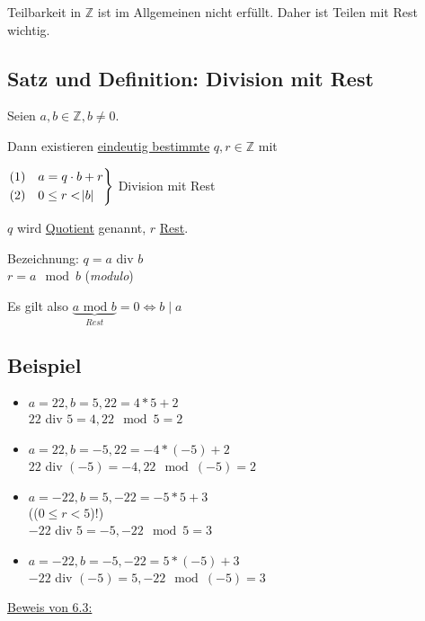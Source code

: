 \documentclass[a4paper, 12pt, twoside] {article}
\newcommand{\attention}{{\fontencoding{U}\fontfamily{futs}\selectfont\char 66\relax}\space}
\begin{document}
Teilbarkeit in $\mathbb{Z}$ ist im Allgemeinen nicht erfüllt. Daher ist Teilen mit Rest wichtig.

\subsection{Satz und Definition: Division mit Rest}

Seien $a,b \in \mathbb{Z}, b \neq 0$.

Dann existieren \uline{eindeutig bestimmte} $q,r \in \mathbb{Z}$ mit

$\begin{rcases}
(1) & a = q \cdot b + r \\
(2) & 0 \leq r < \abs{b}
\end{rcases}$ Division mit Rest


$q$ wird \underline{Quotient} genannt, $r$ \underline{Rest}.

Bezeichnung: $q = a$ div $b$ \\
$r = a \mod b$ (\textit{modulo})

Es gilt also $\underbrace{a \text{ mod } b}_{Rest} = 0 \Leftrightarrow b \mid a$

\subsection{Beispiel}

\begin{itemize}

\item $a = 22, b = 5, 22 = 4*5 +2$ \\
$22$ div $5 = 4, 22 \mod 5 = 2$

\item $a = 22, b = -5, 22 = -4*(-5) + 2$ \\
$22$ div $(-5) = -4, 22 \mod (-5) = 2$

\item $a = -22, b = 5, -22 = -5*5+3$ \\
(\attention ($0 \leq r < 5$)!) \\
$-22$ div $5 = -5, -22 \mod 5 = 3$

\item $a = -22, b = -5, -22 = 5*(-5) + 3$ \\
$-22$ div $(-5) = 5, -22 \mod (-5) = 3$

\end{itemize}

\underline{Beweis von 6.3:}
\end{document}
